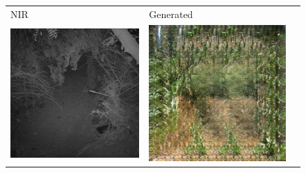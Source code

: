 \documentclass[a4paper,11pt, DIV=12]{scrartcl}
\begin{document}
\begin{figure}[ht]
   \centering
   \begin{tabularx}{.4\textwidth}{>{\centering\arraybackslash}X >{\centering\arraybackslash}X >{\centering\arraybackslash}X}
      NIR \cite{caltech}                                                  & Generated                                                          \\
      \includegraphics{img/5858c26e-23d2-11e8-a6a3-ec086b02610b_real.png} & \includegraphics{img/5858c26e-23d2-11e8-a6a3-ec086b02610b_hal.png} \\

\end{tabularx}
\end{figure}
\end{document}
